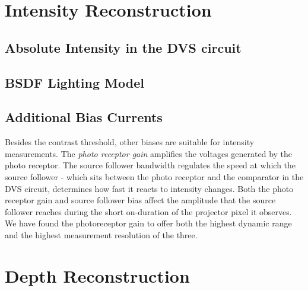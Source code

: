 \section{Intensity Reconstruction}
\subsection{Absolute Intensity in the DVS circuit}

\subsection{BSDF Lighting Model}

\subsection{Additional Bias Currents}

Besides the contrast threshold, other biases are suitable for intensity measurements. The \textit{photo receptor gain} amplifies the voltages generated by the photo receptor. The source follower bandwidth regulates the speed at which the source follower - which sits between the photo receptor and the comparator in the DVS circuit, determines how fast it reacts to intensity changes. Both the photo receptor gain and source follower bias affect the amplitude that the source follower reaches during the short on-duration of the projector pixel it observes.
\newline
\newline
We have found the photoreceptor gain to offer both the highest dynamic range and the highest measurement resolution of the three.
\newline \newline

\section{Depth Reconstruction}

